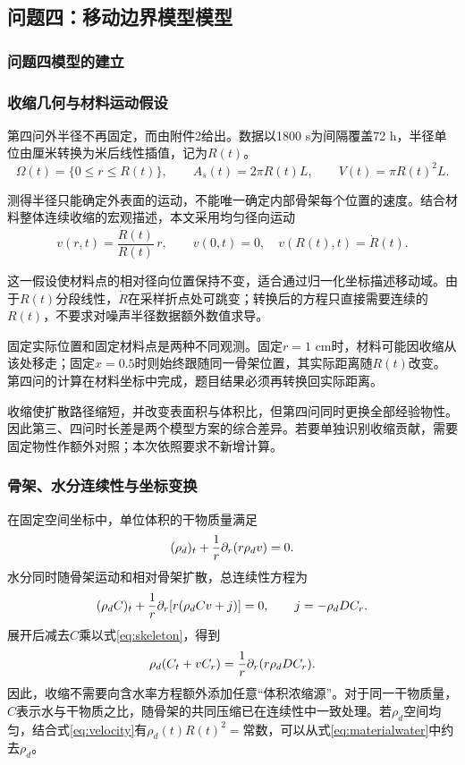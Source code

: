 \subsection{问题四：移动边界模型模型}
\subsubsection{问题四模型的建立}
\subsubsection*{收缩几何与材料运动假设}
第四问外半径不再固定，而由附件2给出。数据以1800 s为间隔覆盖72 h，半径单位由厘米转换为米后线性插值，记为$R(t)$。
\begin{equation}
\Omega(t)=\{0\le r\le R(t)\},\qquad
A_s(t)=2\pi R(t)L,\qquad V(t)=\pi R(t)^2L .
\end{equation}

测得半径只能确定外表面的运动，不能唯一确定内部骨架每个位置的速度。结合材料整体连续收缩的宏观描述\cite{mayor}，本文采用均匀径向运动
\begin{equation}
v(r,t)=\frac{\dot R(t)}{R(t)}\,r,\qquad
v(0,t)=0,\quad v(R(t),t)=\dot R(t).
\label{eq:velocity}
\end{equation}

这一假设使材料点的相对径向位置保持不变，适合通过归一化坐标描述移动域。由于$R(t)$分段线性，$\dot R$在采样折点处可跳变；转换后的方程只直接需要连续的$R(t)$，不要求对噪声半径数据额外数值求导。


固定实际位置和固定材料点是两种不同观测。固定$r=1$ cm时，材料可能因收缩从该处移走；固定$x=0.5$时则始终跟随同一骨架位置，其实际距离随$R(t)$改变。第四问的计算在材料坐标中完成，题目结果必须再转换回实际距离。

收缩使扩散路径缩短，并改变表面积与体积比，但第四问同时更换全部经验物性。因此第三、四问时长差是两个模型方案的综合差异。若要单独识别收缩贡献，需要固定物性作额外对照；本次依照要求不新增计算。

\subsubsection*{骨架、水分连续性与坐标变换}
在固定空间坐标中，单位体积的干物质量满足
\begin{equation}
(\rho_d)_t+\frac1r\partial_r(r\rho_dv)=0 .
\label{eq:skeleton}
\end{equation}
水分同时随骨架运动和相对骨架扩散，总连续性方程为
\begin{equation}
(\rho_dC)_t+\frac1r\partial_r[r(\rho_dCv+j)]=0,
\qquad j=-\rho_dD C_r .
\end{equation}
展开后减去$C$乘以式\eqref{eq:skeleton}，得到
\begin{equation}
\rho_d(C_t+vC_r)=\frac1r\partial_r(r\rho_dD C_r).
\label{eq:materialwater}
\end{equation}
因此，收缩不需要向含水率方程额外添加任意“体积浓缩源”。对于同一干物质量，$C$表示水与干物质之比，随骨架的共同压缩已在连续性中一致处理。若$\rho_d$空间均匀，结合式\eqref{eq:velocity}有$\rho_d(t)R(t)^2=\text{常数}$，可以从式\eqref{eq:materialwater}中约去$\rho_d$。

